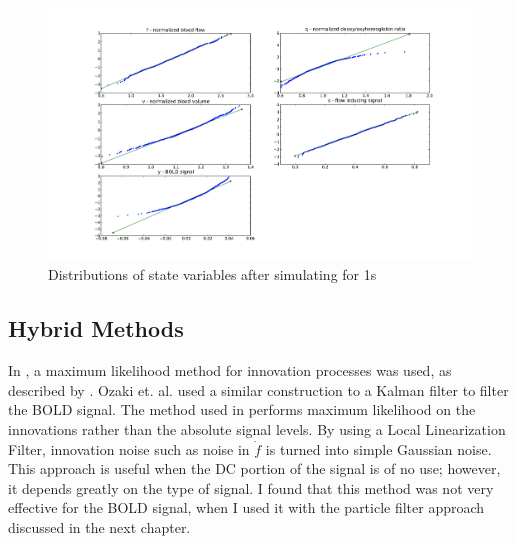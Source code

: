\begin{figure}
\includegraphics[trim=6cm .75cm 6cm .75cm,width=16cm]{images/gauss_step_1sec_3sigma.pdf}
\caption{Distributions of state variables after simulating for 1s}
\label{fig:trans1s}
\end{figure}

\subsection{Hybrid Methods}
In \cite{Riera2003}, a maximum
likelihood method for innovation processes was used, as described by
\cite{Ozaki1994}. Ozaki et. al. used a similar construction to a 
Kalman filter to filter the BOLD signal. 
The method used in \cite{Riera2003} performs maximum likelihood on
the innovations rather than the absolute signal levels. 
By using a Local Linearization Filter,
innovation noise such as noise in $\dot{f}$ is turned into simple 
Gaussian noise. This approach is useful when the DC portion of the signal is
of no use; however, it depends greatly on the type of signal. I found that
this method was not very effective for the BOLD signal, when I used it 
with the particle filter approach discussed in the next chapter.

